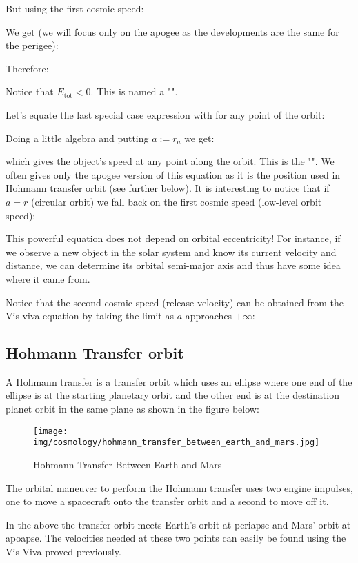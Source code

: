 	But using the first cosmic speed:
	
	We get (we will focus only on the apogee as the developments are the same for the perigee):
	
	Therefore:
	
	Notice that $E_\text{tot} < 0$. This is named a "".
	
	Let's equate the last special case expression with for any point of the orbit:
	
	Doing a little algebra and putting $a:=r_a$ we get:
	
	which gives the object's speed at any point along the orbit. This is the "". We often gives only the apogee version of this equation as it is the position used in Hohmann transfer orbit (see further below). It is interesting to notice that if $a=r$ (circular orbit) we fall back on the first cosmic speed (low-level orbit speed):
	

	This powerful equation does not depend on orbital eccentricity! For instance, if we observe a new object in the solar system and know its current velocity and distance, we can determine its orbital semi-major axis and thus have some idea where it came from.	
		
	Notice that the second cosmic speed (release velocity) can be obtained from the Vis-viva equation by taking the limit as $a$ approaches $+\infty$:
	
	
	\pagebreak
	\subsection{Hohmann Transfer orbit}
	 A Hohmann transfer is a transfer orbit which uses an ellipse where one end of the ellipse is at the starting planetary orbit and the other end is at the destination planet orbit in the same plane as shown in the figure below:
	\begin{figure}[H]
		\centering
		\texttt{[image: img/cosmology/hohmann\_transfer\_between\_earth\_and\_mars.jpg]}
		\caption{Hohmann Transfer Between Earth and Mars}
	\end{figure}
	The orbital maneuver to perform the Hohmann transfer uses two engine impulses, one to move a spacecraft onto the transfer orbit and a second to move off it.
	
	 In the above the transfer orbit meets Earth's orbit at periapse and Mars' orbit at apoapse. The velocities needed at these two points can easily be found using the Vis Viva proved previously.
	 
